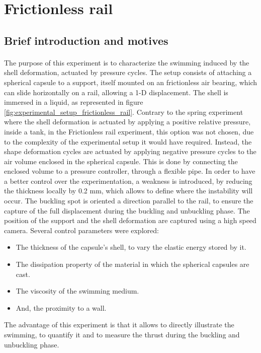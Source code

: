 \section{Frictionless rail}
\subsection{Brief introduction and motives}
\paragraph{}
The purpose of this experiment is to characterize the swimming induced by the shell deformation, actuated by pressure cycles. The setup consists of attaching a spherical capsule to a support, itself mounted on an frictionless air bearing, which can slide horizontally on a rail, allowing a 1-D displacement. The shell is immersed in a liquid, as represented in figure \ref{fig:experimental_setup_frictionless_rail}. Contrary to the spring experiment where the shell deformation is actuated by applying a positive relative pressure, inside a tank, in the Frictionless rail experiment, this option was not chosen, due to the complexity of the experimental setup it would have required. Instead, the shape deformation cycles are actuated by applying negative pressure cycles to the air volume enclosed in the spherical capsule. This is done by connecting the enclosed volume to a pressure controller, through a flexible pipe. In order to have a better control over the experimentation, a weakness is introduced, by reducing the thickness locally by 0.2 mm, which allows to define where the instability will occur. The buckling spot is oriented a direction parallel to the rail, to ensure the capture of the full displacement during the buckling and unbuckling phase. The position of the support and the shell deformation are captured using a high speed camera. Several control parameters were explored:
\begin{itemize}
	\item The thickness of the capsule's shell, to vary the elastic energy stored by it.
	\item The dissipation property of the material in which the spherical capsules are cast.
	\item The viscosity of the swimming medium.
	\item And, the proximity to a wall.
\end{itemize}
The advantage of this experiment is that it allows to directly illustrate the swimming, to quantify it and to measure the thrust during the buckling and unbuckling phase.
